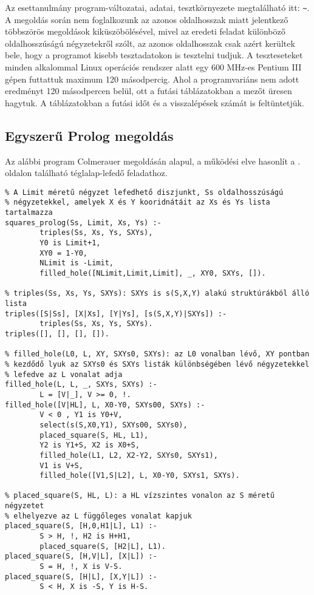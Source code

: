 Az esettanulmány program-változatai, adatai, tesztkörnyezete
megtalálható itt: \verb'~'.
\br
A megoldás során nem foglalkozunk az azonos oldalhosszak miatt jelentkező többszörös
megoldások kiküszöbölésével, mivel az eredeti feladat különböző oldalhosszúságú négyzetekről
szólt, az azonos oldalhosszak csak azért kerültek bele, hogy a programot kisebb
tesztadatokon is tesztelni tudjuk. A teszteseteket minden alkalommal Linux operációs
rendszer alatt egy 600 MHz-es Pentium III gépen futtattuk maximum 120 másodpercig. Ahol
a programvariáns nem adott eredményt 120 másodpercen belül, ott a futási táblázatokban
a mezőt üresen hagytuk. A táblázatokban a futási időt és a visszalépések számát
is feltüntetjük.

\subsection{Egyszerű Prolog megoldás}

Az alábbi program Colmerauer \clpr megoldásán alapul, a működési elve hasonlít a
\pageref{teglalap:clpqr}. oldalon található téglalap-lefedő feladathoz.

\begin{verbatim}
% A Limit méretű négyzet lefedhető diszjunkt, Ss oldalhosszúságú
% négyzetekkel, amelyek X és Y kooridnátáit az Xs és Ys lista tartalmazza
squares_prolog(Ss, Limit, Xs, Ys) :-
        triples(Ss, Xs, Ys, SXYs),
        Y0 is Limit+1,
        XY0 = 1-Y0,
        NLimit is -Limit,
        filled_hole([NLimit,Limit,Limit], _, XY0, SXYs, []).

% triples(Ss, Xs, Ys, SXYs): SXYs is s(S,X,Y) alakú struktúrákból álló lista
triples([S|Ss], [X|Xs], [Y|Ys], [s(S,X,Y)|SXYs]) :-
        triples(Ss, Xs, Ys, SXYs).
triples([], [], [], []).

% filled_hole(L0, L, XY, SXYs0, SXYs): az L0 vonalban lévő, XY pontban
% kezdődő lyuk az SXYs0 és SXYs listák különbségében lévő négyzetekkel
% lefedve az L vonalat adja
filled_hole(L, L, _, SXYs, SXYs) :-
        L = [V|_], V >= 0, !.
filled_hole([V|HL], L, X0-Y0, SXYs00, SXYs) :-
        V < 0 , Y1 is Y0+V,
        select(s(S,X0,Y1), SXYs00, SXYs0),
        placed_square(S, HL, L1),
        Y2 is Y1+S, X2 is X0+S,
        filled_hole(L1, L2, X2-Y2, SXYs0, SXYs1),
        V1 is V+S,
        filled_hole([V1,S|L2], L, X0-Y0, SXYs1, SXYs).

% placed_square(S, HL, L): a HL vízszintes vonalon az S méretű négyzetet
% elhelyezve az L függőleges vonalat kapjuk
placed_square(S, [H,0,H1|L], L1) :-
        S > H, !, H2 is H+H1,
        placed_square(S, [H2|L], L1).
placed_square(S, [H,V|L], [X|L]) :-
        S = H, !, X is V-S.
placed_square(S, [H|L], [X,Y|L]) :-
        S < H, X is -S, Y is H-S.
\end{verbatim}

